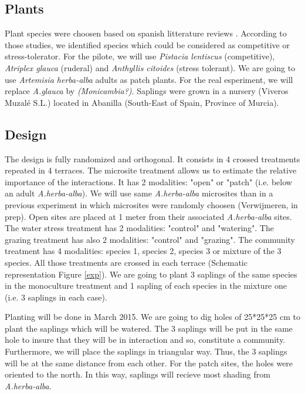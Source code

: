 \documentclass[12pt]{article} %
\begin{document}
\subsection{Plants}
Plant species were choosen based on spanish litterature reviews \citep{McCluney2012,Navarro2006, Jauffret2003}. According to those studies, we identified species which could be considered as competitive or stress-tolerator. For the pilote, we will use \textit{Pistacia lentiscus} (competitive), \textit{Atriplex glauca} (ruderal) and \textit{Anthyllis citoides} (stress tolerant). We are going to use \textit{Artemisia herba-alba} adults as patch plants. For the real esperiment, we will replace \textit{A.glauca} by \textit{(Monicambia?)}. 
Saplings were grown in a nursery (Viveros Muzalé S.L.) located in Abanilla (South-East of Spain, Province of Murcia).

\subsection{Design}
The design is fully randomized and orthogonal. It consists in 4 crossed treatments repeated in 4 terraces. The microsite treatment allows us to estimate the relative importance of the interactions. It has 2 modalities: "open" or "patch" (i.e. below an adult \textit{A.herba-alba}). We will use same \textit{A.herba-alba} microsites than in a previous experiment in which microsites were randomly choosen (Verwijmeren, in prep). Open sites are placed at 1 meter from their associated \textit{A.herba-alba} sites. The water stress treatment has 2 modalities: "control" and "watering". The grazing treatment has also 2 modalities: "control" and "grazing". The community treatment has 4 modalities: species 1, species 2, species 3 or mixture of the 3 species. All those treatments are crossed in each terrace (Schematic representation Figure \ref{exp}). We are going to plant 3 saplings of the same species in the monoculture treatment and 1 sapling of each species in the mixture one (i.e. 3 saplings in each case).

Planting will be done in March 2015. We are going to dig holes of 25*25*25 cm to plant the saplings which will be watered. The 3 saplings will be put in the same hole to insure that they will be in interaction and so, constitute a community. Furthermore, we will place the saplings in triangular way. Thus, the 3 saplings will be at the same distance from each other. For the patch sites, the holes were oriented to the north. In this way, saplings will recieve most shading from \textit{A.herba-alba}.
\end{document}
